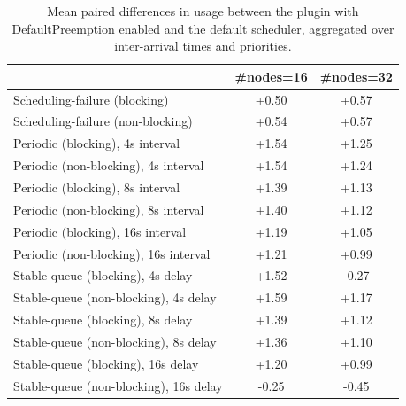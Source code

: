 \begin{table}[t]
\tiny
\setlength{\tabcolsep}{1.2pt}
\renewcommand{\arraystretch}{1.12}
\centering
\caption{Mean paired differences in usage between the plugin with DefaultPreemption enabled and the default scheduler, aggregated over inter-arrival times and priorities.}
\label{tab:usage-defpreempt1-std0-agg-arrival-prio}
\begin{tabular}{l c c}
\toprule
 & \#nodes=16 & \#nodes=32 \\
\midrule
Scheduling-failure (blocking) & +0.50 & +0.57 \\
Scheduling-failure (non-blocking) & +0.54 & +0.57 \\
Periodic (blocking), 4s interval & +1.54 & +1.25 \\
Periodic (non-blocking), 4s interval & +1.54 & +1.24 \\
Periodic (blocking), 8s interval & +1.39 & +1.13 \\
Periodic (non-blocking), 8s interval & +1.40 & +1.12 \\
Periodic (blocking), 16s interval & +1.19 & +1.05 \\
Periodic (non-blocking), 16s interval & +1.21 & +0.99 \\
Stable-queue (blocking), 4s delay & +1.52 & -0.27 \\
Stable-queue (non-blocking), 4s delay & +1.59 & +1.17 \\
Stable-queue (blocking), 8s delay & +1.39 & +1.12 \\
Stable-queue (non-blocking), 8s delay & +1.36 & +1.10 \\
Stable-queue (blocking), 16s delay & +1.20 & +0.99 \\
Stable-queue (non-blocking), 16s delay & -0.25 & -0.45 \\
\bottomrule
\end{tabular}
\end{table}
